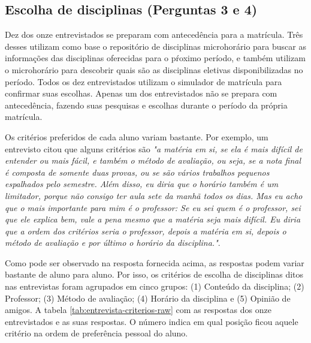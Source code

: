 \subsection{Escolha de disciplinas (Perguntas 3 e 4)}
\label{sec:escolha-disciplinas}

Dez dos onze entrevistados se preparam com antecedência para a matrícula. Três desses utilizam como base o repositório de disciplinas microhorário para buscar as informações das disciplinas oferecidas para o pŕoximo período, e também utilizam o microhorário para descobrir quais são as disciplinas eletivas disponibilizadas no período. Todos os dez entrevistados utilizam o simulador de matrícula para confirmar suas escolhas. Apenas um dos entrevistados não se prepara com antecedência, fazendo suas pesquisas e escolhas durante o período da própria matrícula. 

Os critérios preferidos de cada aluno variam bastante. Por exemplo, um entrevisto citou que alguns critérios são  \textit{"a matéria em si, se ela é mais difícil de entender ou mais fácil, e também o método de avaliação, ou seja, se a nota final é composta de somente duas provas, ou se são vários trabalhos pequenos espalhados pelo semestre. Além disso, eu diria que o horário também é um limitador, porque não consigo ter aula sete da manhã todos os dias. Mas eu acho que o mais importante para mim é o professor: Se eu sei quem é o professor, sei que ele explica bem, vale a pena mesmo que a matéria seja mais difícil. Eu diria que a ordem dos critérios seria o professor, depois a matéria em si, depois o método de avaliação e por último o horário da disciplina."}.

Como pode ser observado na resposta fornecida acima, as respostas podem variar bastante de aluno para aluno. Por isso, os critérios de escolha de disciplinas ditos nas entrevistas foram agrupados em cinco grupos: (1) Conteúdo da disciplina; (2) Professor; (3) Método de avaliação; (4) Horário da disciplina e (5) Opinião de amigos. A tabela \ref{tab:entrevista-criterios-raw} com as respostas dos onze entrevistados e as suas respostas. O número indica em qual posição ficou aquele critério na ordem de preferência pessoal do aluno.

